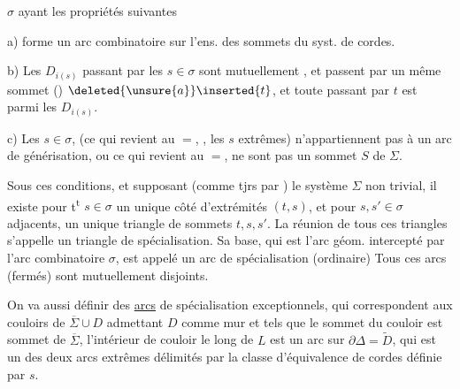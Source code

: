 $\sigma$ ayant les propriétés suivantes 

a)  \inserted{$\sigma$} forme un arc combinatoire sur l'ens. des sommets du syst. de cordes.

b) Les $D_{i(s)}$ passant par les $s\in\sigma$ sont mutuellement , et passent par un même sommet () $\deleted{\unsure{a}}\inserted{t}$, et toute  passant par $t$ est parmi les $D_{i(s)}$.

c)  Les $s\in\sigma$, (ce qui revient au $=$, , les $s$ extrêmes) n'appartiennent pas à un arc de  générisation, ou ce qui revient au $=$, ne sont pas   un sommet $S$ de $\Sigma$.

Sous ces conditions, et supposant (comme tjrs par ) le système $\Sigma$ non trivial,  il existe pour t\textsuperscript{t} $s\in\sigma$ un unique côté d'extrémités $(t,s)$, et pour $s,s'\in\sigma$ adjacents, un unique triangle de  sommets $t,s,s'$. La réunion de tous ces triangles s'appelle un triangle de spécialisation. Sa base, qui est l'arc géom. intercepté par l'arc combinatoire $\sigma$, est appelé un arc de spécialisation (ordinaire)  Tous ces arcs (fermés) sont  mutuellement disjoints. 

On va aussi définir des \uline{arcs} de spécialisation exceptionnels, qui correspondent aux couloirs de $\overline\Sigma\cup D$ admettant $D$ comme mur et tels que le sommet du couloir est sommet de $\overline\Sigma$,    l'intérieur de   couloir le long de $L$ est un arc sur $\partial\Delta=\widetilde D$, qui est un des deux arcs extrêmes délimités par la classe d'équivalence de cordes définie par $s$.


